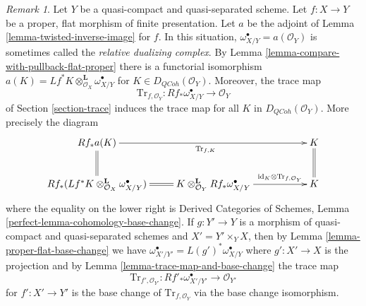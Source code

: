 \documentclass{stacks-project}
\theoremstyle{plain}
\theoremstyle{definition}
\theoremstyle{remark}
\newtheorem{remark}[subsection]{Remark}
\numberwithin{equation}{subsection}
\def\QCoh{\mathit{QCoh}}
\begin{document}
\begin{remark}
\label{remark-relative-dualizing-complex}
Let $Y$ be a quasi-compact and quasi-separated scheme.
Let $f : X \to Y$ be a proper, flat morphism of finite presentation.
Let $a$ be the adjoint of Lemma \ref{lemma-twisted-inverse-image} for $f$.
In this situation, $\omega_{X/Y}^\bullet = a(\mathcal{O}_Y)$
is sometimes called the {\it relative dualizing complex}. By
Lemma \ref{lemma-compare-with-pullback-flat-proper}
there is a functorial isomorphism
$a(K) = Lf^*K \otimes_{\mathcal{O}_X}^\mathbf{L} \omega_{X/Y}^\bullet$
for $K \in D_\QCoh(\mathcal{O}_Y)$. Moreover, the trace map
$$
\text{Tr}_{f, \mathcal{O}_Y} : Rf_*\omega_{X/Y}^\bullet \to \mathcal{O}_Y
$$
of Section \ref{section-trace} induces the trace map for all $K$
in $D_\QCoh(\mathcal{O}_Y)$. More precisely the diagram
$$
\xymatrix{
Rf_*a(K) \ar[rrr]_{\text{Tr}_{f, K}} \ar@{=}[d] & & &
K \ar@{=}[d] \\
Rf_*(Lf^*K \otimes_{\mathcal{O}_X}^\mathbf{L} \omega_{X/Y}^\bullet)
\ar@{=}[r] &
K \otimes_{\mathcal{O}_Y}^\mathbf{L} Rf_*\omega_{X/Y}^\bullet
\ar[rr]^-{\text{id}_K \otimes \text{Tr}_{f, \mathcal{O}_Y}} & & K
}
$$
where the equality on the lower right is
Derived Categories of Schemes, Lemma \ref{perfect-lemma-cohomology-base-change}.
If $g : Y' \to Y$ is a
morphism of quasi-compact and quasi-separated schemes
and $X' = Y' \times_Y X$, then by
Lemma \ref{lemma-proper-flat-base-change} we have
$\omega_{X'/Y'}^\bullet = L(g')^*\omega_{X/Y}^\bullet$ where $g' : X' \to X$
is the projection and by Lemma \ref{lemma-trace-map-and-base-change}
the trace map
$$
\text{Tr}_{f', \mathcal{O}_{Y'}} :
Rf'_*\omega_{X'/Y'}^\bullet \to \mathcal{O}_{Y'}
$$
for $f' : X' \to Y'$ is the base change of $\text{Tr}_{f, \mathcal{O}_Y}$
via the base change isomorphism.
\end{remark}
\end{document}
